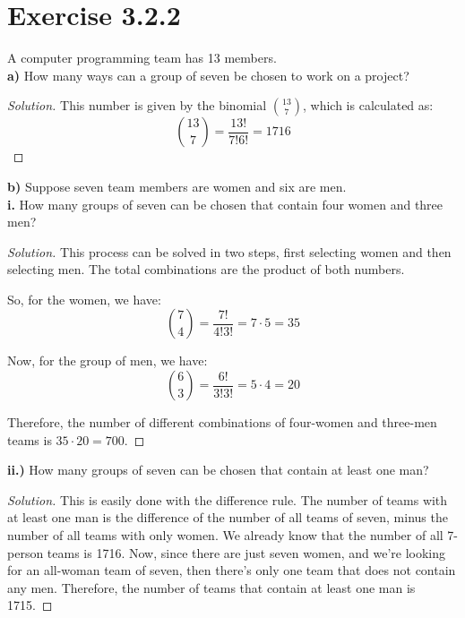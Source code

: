 \documentclass[titlepage, letterpaper, fleqn]{article}
\newcommand{\spacepls}{\vspace{5mm}}
\renewcommand\qedsymbol{\(\blacksquare\)}
\newenvironment{solution}
{\renewcommand\qedsymbol{$\square$}\begin{proof}[Solution]}
{\end{proof}}
\begin{document}
\spacepls

\section{Exercise 3.2.2}

{\large A computer programming team has 13 members.\\
\textbf{a)} How many ways can a group of seven be chosen to work on a project?}

\begin{solution}
This number is given by the binomial \(\binom{13}{7}\), which is calculated as:
\[\binom{13}{7} = \dfrac{13!}{7!6!} = 1716\]
\end{solution}

\spacepls

{\large \textbf{b)} Suppose seven team members are women and six are men.\\
\textbf{i.} How many groups of seven can be chosen that contain four women and three men?}

\begin{solution}
This process can be solved in two steps, first selecting women and then selecting men.
The total combinations are the product of both numbers.

So, for the women, we have:
\[\binom{7}{4} = \dfrac{7!}{4!3!} = 7 \cdot 5 = 35\]

Now, for the group of men, we have:
\[\binom{6}{3} = \dfrac{6!}{3!3!} = 5 \cdot 4  = 20\]

Therefore, the number of different combinations of four-women and three-men teams is \(35 \cdot 20 = 700\).
\end{solution}

\spacepls

{\large \textbf{ii.)} How many groups of seven can be chosen that contain at least one man?}

\begin{solution}
This is easily done with the difference rule.
The number of teams with at least one man is the difference of the number of all teams of seven,
minus the number of all teams with only women.
We already know that the number of all 7-person teams is 1716.
Now, since there are just seven women, and we're looking for an all-woman team of seven,
then there's only one team that does not contain any men.
Therefore, the number of teams that contain at least one man is 1715.
\end{solution}

\spacepls
\end{document}
